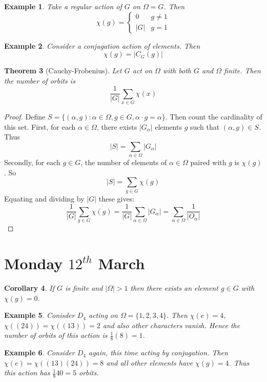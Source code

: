 \documentclass[a4paper,10pt]{article}
\newtheorem{thm}{Theorem}
\newtheorem{Cor}[thm]{Corollary}
\newtheorem{eg}[thm]{Example}
\begin{document}
\begin{eg}
Take a regular action of $G$ on $\Omega = G$. Then
\[ \chi(g) = \begin{cases} 0 & g \neq 1 \\ |G| & g = 1 \end{cases} \]
\end{eg}

\begin{eg}
Consider a conjugation action of elements. Then
\[ \chi(g) = |C_G(g)| \]
\end{eg}

\begin{thm}[Cauchy-Frobenius]
Let $G$ act on $\Omega$ with both $G$ and $\Omega$ finite. Then the number of orbits is
\[ \frac{1}{|G|} \sum_{x \in G} \chi(x) \]
\end{thm}

\begin{proof}
Define $S = \{ (\alpha, g) : \alpha \in \Omega, g \in G, \alpha \cdot g = \alpha \}$. Then count the cardinality of this set. First, for each $\alpha \in \Omega$, there exists $|G_\alpha|$ elements $g$ such that $(\alpha, g) \in S$. Thus
\[ |S| = \sum_{\alpha \in \Omega} |G_\alpha| \]
Secondly, for each $g \in G$, the number of elements of $\alpha \in \Omega$ paired with $g$ is $\chi(g)$. So
\[ |S| = \sum_{g \in G} \chi(g) \]
Equating and dividing by $|G|$ these gives:
\[ \frac{1}{|G|} \sum_{g \in G} \chi(g) = \frac{1}{|G|} \sum_{\alpha \in \Omega} |G_\alpha| = \sum_{\alpha \in \Omega} \frac{1}{|O_\alpha|} \]
\end{proof}

\newpage
\section{Monday $12^{th}$ March}
\begin{Cor}
If $G$ is finite and $|\Omega| >1$ then there exists an element $g \in G$ with $\chi(g) = 0$.  
\end{Cor}

\begin{eg}
Conisder $D_4$ acting on $\Omega = \{ 1,2,3,4 \}$. Then $\chi(e) = 4$, $\chi((24)) = \chi((13)) = 2$ and also other characters vanish. Hence the number of orbits of this action is $\frac{1}{8} (8) = 1$. 
\end{eg}

\begin{eg}
Consider $D_4$ again, this time acting by conjugation. Then $\chi(e) = \chi((13)(24)) = 8$ and all other elements have $\chi(g) = 4$. Thus this action has $\frac{1}{8} 40 = 5$ orbits. 
\end{eg}
\end{document}

